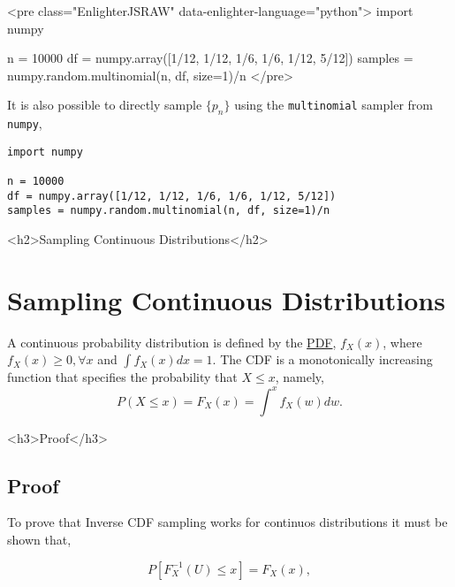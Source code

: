\documentclass[12pt]{article}
\begin{document}
<pre class="EnlighterJSRAW" data-enlighter-language="python">
import numpy

n = 10000
df = numpy.array([1/12, 1/12, 1/6, 1/6, 1/12, 5/12])
samples = numpy.random.multinomial(n, df, size=1)/n
</pre>
\fi

\iftex
It is also possible to directly sample $\{p_n\}$ using the \texttt{multinomial} sampler from
\texttt{numpy},

\begin{verbatim}
import numpy

n = 10000
df = numpy.array([1/12, 1/12, 1/6, 1/6, 1/12, 5/12])
samples = numpy.random.multinomial(n, df, size=1)/n
\end{verbatim}
\fi

\ifblog
<h2>Sampling Continuous Distributions</h2>
\fi
\iftex
\section{Sampling Continuous Distributions}
\fi

A continuous probability distribution is defined by the  \href{https://en.wikipedia.org/wiki/Probability_density_function}{PDF},
$f_X(x)$, where $f_X(x) \geq 0, \forall x$ and $\int f_X(x) dx = 1.$ The CDF is a monotonically increasing function
that specifies the probability that $X \leq x$, namely,
\begin{equation}
\label{eq:continuous_cdf}
P(X \leq x) = F_X(x) = \int^{x} f_X(w) dw.
\end{equation}

\ifblog
<h3>Proof</h3>
\fi
\iftex
\subsection{Proof}
\fi

To prove that Inverse CDF sampling works for continuos distributions it must be shown that,

\begin{equation}
\label{eq:continuous_proof}
P[F_X^{-1}(U) \leq x] = F_X(x),
\end{equation}
\end{document}
